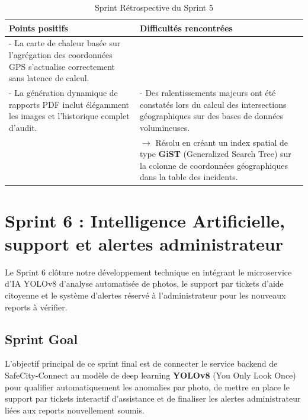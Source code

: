 \begin{table}[H]
    \centering
    \caption{Sprint Rétrospective du Sprint 5}
    \label{tab:retro_sprint5}
    \vspace{0.2cm}
    \small
    \begin{tabularx}{\textwidth}{|X|X|}
        \hline
        \textbf{Points positifs} & \textbf{Difficultés rencontrées} \\ \hline
        - La carte de chaleur basée sur l'agrégation des coordonnées GPS s'actualise correctement sans latence de calcul.\\
        - La génération dynamique de rapports PDF inclut élégamment les images et l'historique complet d'audit. & 
        - Des ralentissements majeurs ont été constatés lors du calcul des intersections géographiques sur des bases de données volumineuses.\\
        & $\rightarrow$ Résolu en créant un index spatial de type \textbf{GiST} (Generalized Search Tree) sur la colonne de coordonnées géographiques dans la table des incidents. \\
        \hline
    \end{tabularx}
\end{table}

\section{Sprint 6 : Intelligence Artificielle, support et alertes administrateur}
Le Sprint 6 clôture notre développement technique en intégrant le microservice d'IA YOLOv8 d'analyse automatisée de photos, le support par tickets d'aide citoyenne et le système d'alertes réservé à l'administrateur pour les nouveaux reports à vérifier.

\subsection{Sprint Goal}
L'objectif principal de ce sprint final est de connecter le service backend de SafeCity-Connect au modèle de deep learning \textbf{YOLOv8} (You Only Look Once) pour qualifier automatiquement les anomalies par photo, de mettre en place le support par tickets interactif d'assistance et de finaliser les alertes administrateur liées aux reports nouvellement soumis.

